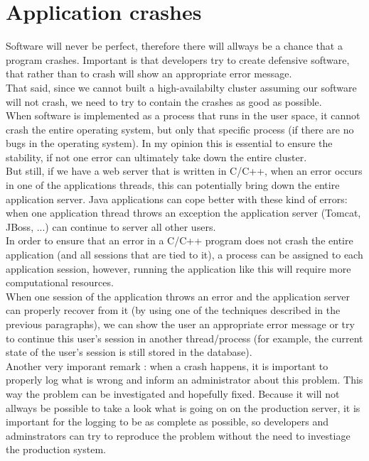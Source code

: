 \documentclass[12pt]{report}
\begin{document}
\section{Application crashes}
Software will never be perfect, therefore there will allways be a
chance that a program crashes. Important is that developers try to
create defensive software, that rather than to crash will show an
appropriate error message.\\
That said, since we cannot built a high-availabilty cluster assuming
our software will not crash, we need to try to contain the crashes as
good as possible.\\
When software is implemented as a process that runs in the user space,
it cannot crash the entire operating system, but only that specific process (if
there are no bugs in the operating system). In my opinion this is
essential to ensure the stability, if not one error can ultimately
take down the entire cluster.\\
But still, if we have a web server that is written in C/C++, when an
error occurs in one of the applications threads, this can potentially
bring down the entire application server. Java applications can cope
better with these kind of errors: when one application thread throws
an exception the application server (Tomcat, JBoss, ...) can continue
to server all other users.\\ 
In order to ensure that an error in a  C/C++ program does not crash the entire
application (and all sessions that are tied to it),  a process can be
assigned to each application session, however, running the application
like this will require more computational resources.\\
When one session of the application throws an error and the
application server can properly recover from it (by using one of the
techniques described in the previous paragraphs), we can show the
user an appropriate error message or try to continue this user's
session in another thread/process (for example, the current state of
the user's session is still stored in the database).\\
Another very imporant remark : when a crash happens, it is important
to properly log what is wrong and inform an administrator about this
problem. This way the problem can be investigated and hopefully
fixed. 
Because it will not allways be possible to take a look what is
going on on the production server, it is important for the logging to
be as complete as possible, so developers and adminstrators can try to
reproduce the problem without the need to investiage the production system.
\end{document}
